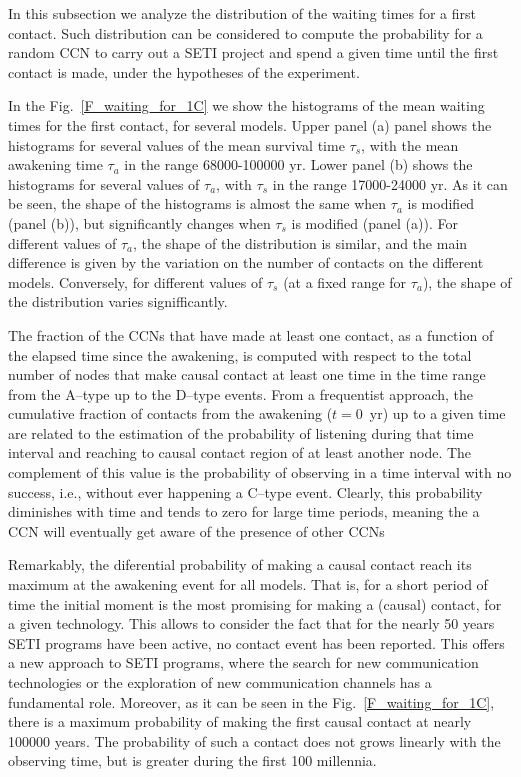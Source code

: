 \documentclass[crop]{CSLB}
\newcommand{\ceti}{CCN}
\newcommand{\cetis}{CCNs}
\newcommand{\ffn}[1]{}
\begin{document}
In this subsection we analyze the distribution of the waiting times for
a first contact.
%
Such distribution can be considered to compute the probability for a
random \ceti{} to carry out a SETI project and spend a given time until
the first contact is made, under the hypotheses of the experiment.
%
\ffn{6}
%
In the Fig.~\ref{F_waiting_for_1C} we show the histograms of the mean
waiting times for the first contact, for several models.
%
Upper panel (a) panel shows the histograms for several values of the
mean survival time $\tau_s$, with the mean awakening time $\tau_a$ in
the range 68000-100000 yr.
%
Lower panel (b) shows the histograms for several values of $\tau_a$,
with $\tau_s$ in the range 17000-24000 yr.
%
As it can be seen, the shape of the histograms is almost the same when
$\tau_a$ is modified (panel (b)), but significantly changes when
$\tau_s$ is modified (panel (a)). 
%
For different values of $\tau_a$, the shape of the distribution is
similar, and the main difference is given by the variation on the number of
contacts on the different models.
%
Conversely, for different values of $\tau_s$ (at a fixed range for
$\tau_a$), the shape of the
distribution varies signifficantly.

 

The fraction of the \cetis{} that have made at least one contact, as a
function of the elapsed time since the awakening, is computed with
respect to the total number of nodes that make causal contact at least
one time in the time range from the A--type up to the D--type
events.
%
From a frequentist approach, the cumulative fraction of contacts
from the awakening
($t=$0~yr) up to a given time are related to the estimation of the
probability of listening during that time interval and reaching to
causal contact region of at least another node.
%
The complement of this value is the probability of observing in a time
interval with no success, i.e., without ever happening a C--type
event.
%
Clearly, this probability diminishes with time and tends to zero for
large time periods, meaning the a \ceti{} will eventually get aware of
the presence of other \cetis{}



Remarkably, the diferential probability of making a causal contact reach its
maximum at the awakening event for all models.
%
That is, for a short period of time the initial moment is the most promising
for making a (causal) contact, for a given technology.
%
This allows to consider the fact that for the nearly 50 years SETI
programs have been active, no contact event has been reported.
%
This offers a new approach to SETI programs, where the
search for new communication technologies or the exploration of
new communication channels has a fundamental role.
%
Moreover, as it can be seen in the Fig.~\ref{F_waiting_for_1C}, there
is a maximum probability of making the first causal contact at nearly
100000 years.
%
The probability of such a contact does not grows linearly
with the observing time, but is greater during the first 100
millennia.
\end{document}
